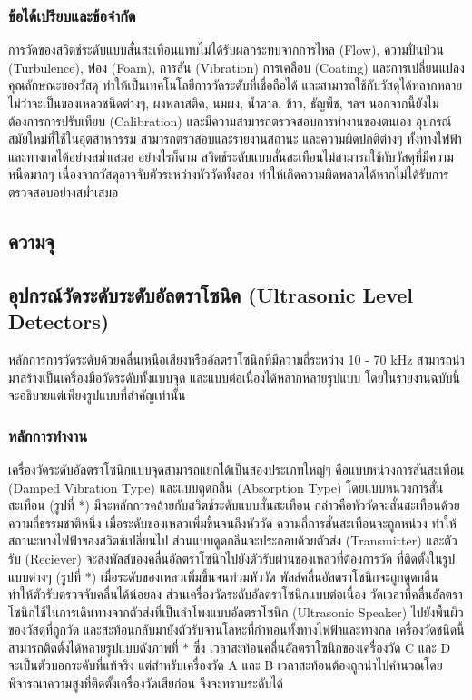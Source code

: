 \documentclass[final,11pt]{article}
\begin{document}
\subsubsection{ข้อได้เปรียบและข้อจำกัด}
การวัดของสวิตช์ระดับแบบสั่นสะเทือนแทบไม่ได้รับผลกระทบจากการไหล (Flow), ความปั่นป่วน (Turbulence), ฟอง (Foam), การสั่น (Vibration)
การเคลือบ (Coating) และการเปลี่ยนแปลงคุณลักษณะของวัสดุ ทำให้เป็นเทคโนโลยีการวัดระดับที่เชื่อถือได้ และสามารถใช้กับวัสดุได้หลากหลาย ไม่ว่าจะเป็นของเหลวชนิดต่างๆ,
ผงพลาสติค, นมผง, น้ำตาล, ข้าว, ธัญพืช, ฯลฯ นอกจากนี้ยังไม่ต้องการการปรับเทียบ (Calibration) และมีความสามารถตรวจสอบการทำงานของตนเอง อุปกรณ์สมัยใหม่ที่ใช้ในอุตสาหกรรม 
สามารถตรวสอบและรายงานสถานะ และความผิดปกติต่างๆ ทั้งทางไฟฟ้าและทางกลได้อย่างสม่ำเสมอ อย่างไรก็ตาม 
สวิตช์ระดับแบบสั่นสะเทือนไม่สามารถใช้กับวัสดุที่มีความหนืดมากๆ เนื่องจากวัสดุอาจจับตัวระหว่างหัววัดทั้งสอง ทำให้เกิดความผิดพลาดได้หากไม่ได้รับการตรวจสอบอย่างสม่ำเสมอ 

\subsection{ความจุ}

\subsection{อุปกรณ์วัดระดับระดับอัลตราโซนิค (Ultrasonic Level Detectors)}
หลักการการวัดระดับด้วยคลื่นเหนือเสียงหรืออัลตราโซนิกที่มีความถี่ระหว่าง 10 - 70 kHz สามารถนำมาสร้างเป็นเครื่องมือวัดระดับทั้งแบบจุด 
และแบบต่อเนื่องได้หลากหลายรูปแบบ โดยในรายงานฉบับนี้จะอธิบายแต่เพียงรูปแบบที่สำคัญเท่านั้น
\subsubsection{หลักการทำงาน}
เครื่องวัดระดับอัลตราโซนิกแบบจุดสามารถแยกได้เป็นสองประเภทใหญ่ๆ คือแบบหน่วงการสั่นสะเทือน (Damped Vibration Type)
และแบบดูดกลืน (Absorption Type) โดยแบบหน่วงการสั่นสะเทือน (รูปที่ *) มีจะหลักการคล้ายกับสวิตช์ระดับแบบสั่นสะเทือน 
กล่าวคือหัววัดจะสั่นสะเทือนด้วยความถี่ธรรมชาติหนึ่ง เมื่อระดับของเหลวเพิ่มขึ้นจนถึงหัววัด ความถี่การสั่นสะเทือนจะถูกหน่วง ทำให้สถานะทางไฟฟ้าของสวิตช์เปลี่ยนไป 
ส่วนแบบดูดกลืนจะประกอบด้วยตัวส่ง (Transmitter) และตัวรับ (Reciever) จะส่งพัลส์ของคลื่นอัลตราโซนิกไปยังตัวรับผ่านของเหลวที่ต้องการวัด 
ที่ติดตั้งในรูปแบบต่างๆ (รูปที่ *) เมื่อระดับของเหลวเพิ่มขึ้นจนท่วมหัววัด พัลส์คลื่นอัลตราโซนิกจะถูกดูดกลืน ทำให้ตัวรับตรวจจับคลื่นได้น้อยลง 
ส่วนเครื่องวัดระดับอัลตราโซนิกแบบต่อเนื่อง วัดเวลาที่คลื่นอัลตราโซนิกใช้ในการเดินทางจากตัวส่งที่เป็นลำโพงแบบอัลตราโซนิก (Ultrasonic Speaker)
ไปยังพื้นผิวของวัสดุที่ถูกวัด และสะท้อนกลับมายังตัวรับจานโลหะที่กำทอนทั้งทางไฟฟ้าและทางกล เครื่องวัดชนิดนี้สามารถติดตั้งได้หลายรูปแบบดังภาพที่ * ซึ่ง
เวลาสะท้อนคลื่นอัลตราโซนิกของเครื่องวัด C และ D จะเป็นตัวบอกระดับที่แท้จริง แต่สำหรับเครื่องวัด A และ B 
เวลาสะท้อนต้องถูกนำไปคำนวณโดยพิจารณาความสูงที่ติดตั้งเครื่องวัดเสียก่อน จึงจะทราบระดับได้
\end{document}
